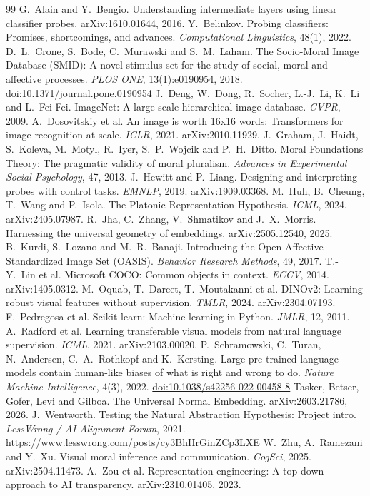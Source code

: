 \documentclass[11pt]{article}
\begin{document}
\begin{thebibliography}{99}\small
{} G.~Alain and Y.~Bengio. Understanding intermediate layers using linear classifier probes. arXiv:1610.01644, 2016.
 Y.~Belinkov. Probing classifiers: Promises, shortcomings, and advances. \emph{Computational Linguistics}, 48(1), 2022.
 D.~L.~Crone, S.~Bode, C.~Murawski and S.~M.~Laham. The Socio-Moral Image Database (SMID): A novel stimulus set for the study of social, moral and affective processes. \emph{PLOS ONE}, 13(1):e0190954, 2018. \href{https://doi.org/10.1371/journal.pone.0190954}{doi:10.1371/journal.pone.0190954}
 J.~Deng, W.~Dong, R.~Socher, L.-J.~Li, K.~Li and L.~Fei-Fei. ImageNet: A large-scale hierarchical image database. \emph{CVPR}, 2009.
 A.~Dosovitskiy et al. An image is worth 16x16 words: Transformers for image recognition at scale. \emph{ICLR}, 2021. arXiv:2010.11929.
 J.~Graham, J.~Haidt, S.~Koleva, M.~Motyl, R.~Iyer, S.~P.~Wojcik and P.~H.~Ditto. Moral Foundations Theory: The pragmatic validity of moral pluralism. \emph{Advances in Experimental Social Psychology}, 47, 2013.
 J.~Hewitt and P.~Liang. Designing and interpreting probes with control tasks. \emph{EMNLP}, 2019. arXiv:1909.03368.
 M.~Huh, B.~Cheung, T.~Wang and P.~Isola. The Platonic Representation Hypothesis. \emph{ICML}, 2024. arXiv:2405.07987.
 R.~Jha, C.~Zhang, V.~Shmatikov and J.~X.~Morris. Harnessing the universal geometry of embeddings. arXiv:2505.12540, 2025.
 B.~Kurdi, S.~Lozano and M.~R.~Banaji. Introducing the Open Affective Standardized Image Set (OASIS). \emph{Behavior Research Methods}, 49, 2017.
 T.-Y.~Lin et al. Microsoft COCO: Common objects in context. \emph{ECCV}, 2014. arXiv:1405.0312.
 M.~Oquab, T.~Darcet, T.~Moutakanni et al. DINOv2: Learning robust visual features without supervision. \emph{TMLR}, 2024. arXiv:2304.07193.
 F.~Pedregosa et al. Scikit-learn: Machine learning in Python. \emph{JMLR}, 12, 2011.
 A.~Radford et al. Learning transferable visual models from natural language supervision. \emph{ICML}, 2021. arXiv:2103.00020.
 P.~Schramowski, C.~Turan, N.~Andersen, C.~A.~Rothkopf and K.~Kersting. Large pre-trained language models contain human-like biases of what is right and wrong to do. \emph{Nature Machine Intelligence}, 4(3), 2022. \href{https://doi.org/10.1038/s42256-022-00458-8}{doi:10.1038/s42256-022-00458-8}
 Tasker, Betser, Gofer, Levi and Gilboa. The Universal Normal Embedding. arXiv:2603.21786, 2026.
 J.~Wentworth. Testing the Natural Abstraction Hypothesis: Project intro. \emph{LessWrong / AI Alignment Forum}, 2021. \url{https://www.lesswrong.com/posts/cy3BhHrGinZCp3LXE}
 W.~Zhu, A.~Ramezani and Y.~Xu. Visual moral inference and communication. \emph{CogSci}, 2025. arXiv:2504.11473.
 A.~Zou et al. Representation engineering: A top-down approach to AI transparency. arXiv:2310.01405, 2023.
\end{thebibliography}
\end{document}
